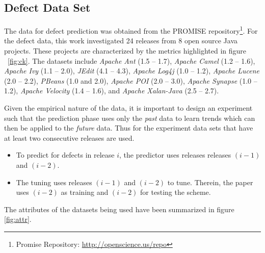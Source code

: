 \documentclass[12pt]{IEEEtran}
\begin{document}
\subsection{Defect Data Set}
The data for defect prediction was obtained from the PROMISE repository\footnote{Promise Repository: \url{http://openscience.us/repo}}. For the defect data, this work investigated 24 releases from 8 open source Java projects. These projects are characterized by the metrics highlighted in figure ~\ref{fig:ck}. The datasets include \emph{Apache Ant} (1.5 -- 1.7), \emph{Apache Camel} (1.2 -- 1.6), \emph{Apache Ivy} (1.1 -- 2.0), \emph{JEdit} (4.1 -- 4.3), \emph{Apache Log4j} (1.0 -- 1.2), \emph{Apache Lucene} (2.0 -- 2.2), \emph{PBeans} (1.0 and 2.0), \emph{Apache POI} (2.0 -- 3.0), \emph{Apache Synapse} (1.0 -- 1.2), \emph{Apache Velocity} (1.4 -- 1.6), and \emph{Apache Xalan-Java} (2.5 -- 2.7). 

Given the empirical nature of the data, it is important to design an experiment such that the prediction phase uses only the \emph{past} data to learn trends which can then be applied to the \emph{future} data. Thus for the experiment data sets that have at least two consecutive releases are used. 
\begin{itemize}
	\item To predict for defects in release $i$, the predictor uses releases releases $(i-1)$ and $(i-2)$.
	\item The tuning uses releases $(i-1)$ and $(i-2)$ to tune. Therein, the paper uses $(i-2)$ as training and $(i-2)$ for testing the scheme.
\end{itemize}

The attributes of the datasets being used have been summarized in figure \ref{fig:attr}.
\end{document}
